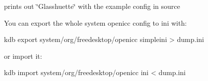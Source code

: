 prints out \char`\"{}\+Glasshuette\char`\"{} with the example config in source

You can export the whole system openicc config to ini with\+:


\begin{DoxyCode}
kdb export system/org/freedesktop/openicc simpleini > dump.ini
\end{DoxyCode}


or import it\+:


\begin{DoxyCode}
kdb import system/org/freedesktop/openicc ini < dump.ini
\end{DoxyCode}
 